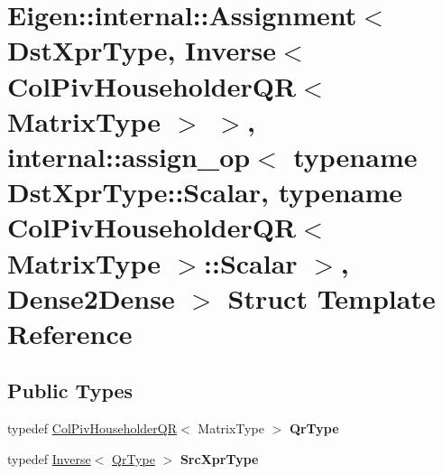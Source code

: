 \hypertarget{struct_eigen_1_1internal_1_1_assignment_3_01_dst_xpr_type_00_01_inverse_3_01_col_piv_householdera738c212c6cb5ba27ad8c50c6864d6b5}{}\section{Eigen\+::internal\+::Assignment$<$ Dst\+Xpr\+Type, Inverse$<$ Col\+Piv\+Householder\+QR$<$ Matrix\+Type $>$ $>$, internal\+::assign\+\_\+op$<$ typename Dst\+Xpr\+Type\+::Scalar, typename Col\+Piv\+Householder\+QR$<$ Matrix\+Type $>$\+::Scalar $>$, Dense2\+Dense $>$ Struct Template Reference}
\label{struct_eigen_1_1internal_1_1_assignment_3_01_dst_xpr_type_00_01_inverse_3_01_col_piv_householdera738c212c6cb5ba27ad8c50c6864d6b5}
\subsection*{Public Types}
\begin{DoxyCompactItemize}
\item 
\mbox{\label{struct_eigen_1_1internal_1_1_assignment_3_01_dst_xpr_type_00_01_inverse_3_01_col_piv_householdera738c212c6cb5ba27ad8c50c6864d6b5_a1e7c6b004bdccc765df8ca4ba1e9310c}} 
typedef \mbox{\hyperlink{class_eigen_1_1_col_piv_householder_q_r}{Col\+Piv\+Householder\+QR}}$<$ Matrix\+Type $>$ {\bfseries Qr\+Type}
\item 
\mbox{\label{struct_eigen_1_1internal_1_1_assignment_3_01_dst_xpr_type_00_01_inverse_3_01_col_piv_householdera738c212c6cb5ba27ad8c50c6864d6b5_a43b5c87a5bed26cf5fa59fc2f3d160b1}} 
typedef \mbox{\hyperlink{class_eigen_1_1_inverse}{Inverse}}$<$ \mbox{\hyperlink{class_eigen_1_1_col_piv_householder_q_r}{Qr\+Type}} $>$ {\bfseries Src\+Xpr\+Type}
\end{DoxyCompactItemize}
